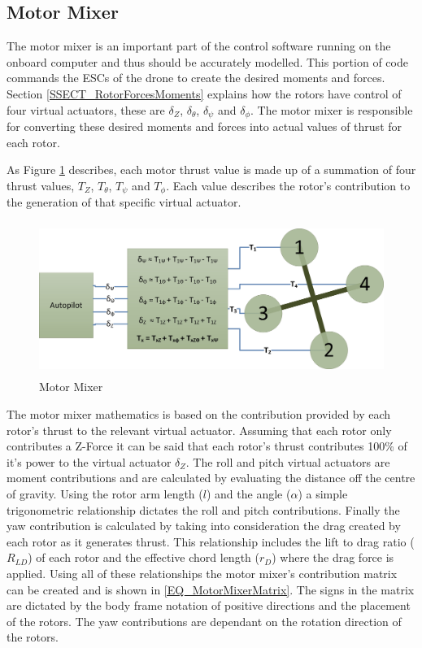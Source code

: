 	\subsection{Motor Mixer}		
	The motor mixer is an important part of the control software running on the onboard computer and thus should be accurately modelled. This portion of code commands the ESCs of the drone to create the desired moments and forces. Section \ref{SSECT_RotorForcesMoments} explains how the rotors have control of four virtual actuators, these are $\delta_Z$, $\delta_{\theta}$, $\delta_{\psi}$ and $\delta_{\phi}$. The motor mixer is responsible for converting these desired moments and forces into actual values of thrust for each rotor.
	
	As Figure \ref{IM_MotorMixer} describes, each motor thrust value is made up of a summation of four thrust values,  $T_Z$, $T_{\theta}$, $T_{\psi}$ and $T_{\phi}$. Each value describes the rotor's contribution to the generation of that specific virtual actuator.
	 
	\begin{figure}[H]
		\centering
		\includegraphics[height = 5cm]{../References/Diagrams/MotorMixer.jpg}
		\caption{Motor Mixer}
		\label{IM_MotorMixer}
	\end{figure}
	
	The motor mixer mathematics is based on the contribution provided by each rotor's thrust to the relevant virtual actuator. Assuming that each rotor only contributes a Z-Force it can be said that each rotor's thrust contributes 100\% of it's power to the virtual actuator $\delta_{Z}$. The roll and pitch virtual actuators are moment contributions and are calculated by evaluating the distance off the centre of gravity. Using the rotor arm length ($l$) and the angle ($\alpha$) a simple trigonometric relationship dictates the roll and pitch contributions. Finally the yaw contribution is calculated by taking into consideration the drag created by each rotor as it generates thrust. This relationship includes the lift to drag ratio ($R_{LD}$) of each rotor and the effective chord length ($r_D$) where the drag force is applied. Using all of these relationships the motor mixer's contribution matrix can be created and is shown in \eqref{EQ_MotorMixerMatrix}. The signs in the matrix are dictated by the body frame notation of positive directions and the placement of the rotors. The yaw contributions are dependant on the rotation direction of the rotors.

